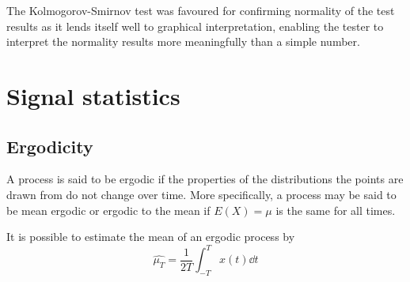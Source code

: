 The Kolmogorov-Smirnov test was favoured for confirming normality of the test results as it lends itself well to graphical interpretation, enabling the tester to interpret the normality results more meaningfully than a simple number.

\section{Signal statistics}

\subsection{Ergodicity}
A process is said to be ergodic if the properties of the distributions the points are drawn from do not change over time.  
More specifically, a process may be said to be mean ergodic or ergodic to the mean if $E(X)=\mu$ is the same for all times.

It is possible to estimate the mean of an ergodic process by 
\begin{equation}
  \hat{\mu_T} = \frac{1}{2T} \int_{-T}^{T} x(t) \dd t
\end{equation}




